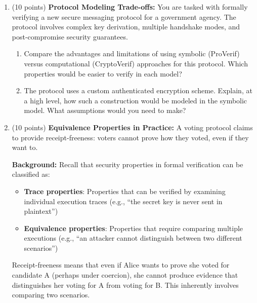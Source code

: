 \documentclass[10pt,a4paper,american]{exam}
\begin{document}
\begin{enumerate}
	\item (10 points) \textbf{Protocol Modeling Trade-offs:}
	      You are tasked with formally verifying a new secure messaging protocol for a government agency. The protocol involves complex key derivation, multiple handshake modes, and post-compromise security guarantees.
	      \begin{enumerate}
		      \item Compare the advantages and limitations of using symbolic (ProVerif) versus computational (CryptoVerif) approaches for this protocol. Which properties would be easier to verify in each model?
		      \item The protocol uses a custom authenticated encryption scheme. Explain, at a high level, how such a construction would be modeled in the symbolic model. What assumptions would you need to make?
	      \end{enumerate}
	\item (10 points) \textbf{Equivalence Properties in Practice:}
	      A voting protocol claims to provide receipt-freeness: voters cannot prove how they voted, even if they want to.

	      \textbf{Background:} Recall that security properties in formal verification can be classified as:
	      \begin{itemize}
		      \item \textbf{Trace properties}: Properties that can be verified by examining individual execution traces (e.g., ``the secret key is never sent in plaintext'')
		      \item \textbf{Equivalence properties}: Properties that require comparing multiple executions (e.g., ``an attacker cannot distinguish between two different scenarios'')
	      \end{itemize}

	      Receipt-freeness means that even if Alice wants to prove she voted for candidate A (perhaps under coercion), she cannot produce evidence that distinguishes her voting for A from voting for B. This inherently involves comparing two scenarios.


\end{enumerate}
\end{document}

